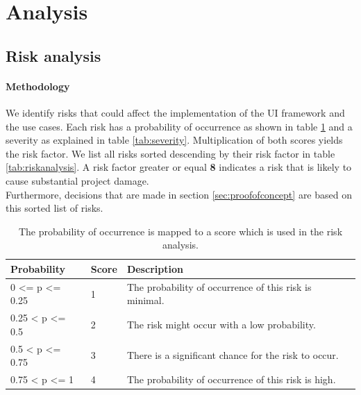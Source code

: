 \section{Analysis}
\subsection{Risk analysis}\label{sec:riskanalysis}

\paragraph{Methodology}
We identify risks that could affect the implementation of the UI framework and the use cases. Each risk has a probability of occurrence as shown in table \ref{tab:probability} and a severity as explained in table \ref{tab:severity}. Multiplication of both scores yields the risk factor. We list all risks sorted descending by their risk factor in table \ref{tab:riskanalysis}. A risk factor greater or equal \textbf{8} indicates a risk that is likely to cause substantial project damage. \\
Furthermore, decisions that are made in section \ref{sec:proofofconcept} are based on this sorted list of risks.

\begin{table}[!htb]
  \begin{center}
    \begin{tabular}{|l|l|l|}
      \hline
      \textbf{Probability} & \textbf{Score} & \textbf{Description} \\
      \hline
      0 <= p <= 0.25 & 1 & The probability of occurrence of this risk is minimal. \\
      \hline
      0.25 < p <= 0.5 & 2 & The risk might occur with a low probability. \\
      \hline
      0.5 < p <= 0.75 & 3 & There is a significant chance for the risk to occur. \\
      \hline
      0.75 < p <= 1 & 4 & The probability of occurrence of this risk is high. \\
      \hline
    \end{tabular}
    \caption{The probability of occurrence is mapped to a score which is used in the risk analysis.}
    \label{tab:probability}
  \end{center}
\end{table}

